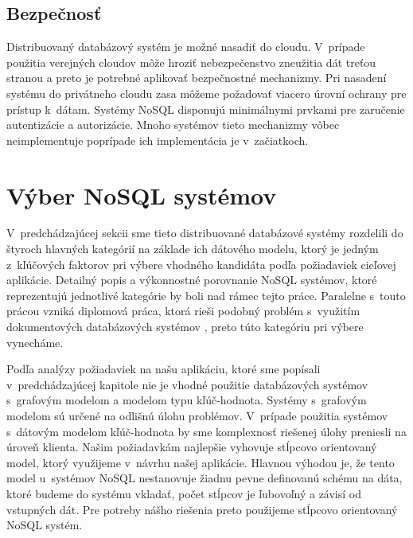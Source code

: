 \documentclass[11pt,twoside,a4paper]{book}
\begin{document}
\subsection{Bezpečnosť}
Distribuovaný databázový systém je možné nasadiť do cloudu. V~prípade použitia verejných cloudov môže hroziť nebezpečenstvo zneužitia dát treťou stranou a preto je potrebné aplikovať bezpečnostné mechanizmy. Pri nasadení systému do privátneho cloudu zasa môžeme požadovať viacero úrovní ochrany pre prístup k~dátam. Systémy NoSQL disponujú minimálnymi prvkami pre zaručenie autentizácie a autorizácie. Mnoho systémov tieto mechanizmy vôbec neimplementuje poprípade ich implementácia je v~začiatkoch.



\section{Výber NoSQL systémov}
V~predchádzajúcej sekcii sme tieto distribuované databázové systémy rozdelili do štyroch hlavných kategórií na základe ich dátového modelu, ktorý je jedným z~kľúčových faktorov pri výbere vhodného kandidáta podľa požiadaviek cieľovej aplikácie. Detailný popis a výkonnostné porovnanie NoSQL systémov, ktoré reprezentujú jednotlivé kategórie by boli nad rámec tejto práce. Paralelne s~touto prácou vzniká diplomová práca, ktorá rieši podobný problém s~využitím dokumentových databázových systémov  \cite{barina}, preto túto kategóriu pri výbere vynecháme.

Podľa analýzy požiadaviek na našu aplikáciu, ktoré sme popísali v~predchádzajúcej kapitole nie je vhodné použitie databázových systémov s~grafovým modelom a modelom typu kľúč-hodnota. Systémy s~grafovým modelom sú určené na odlišnú úlohu problémov. V~prípade použitia systémov s~dátovým modelom kľúč-hodnota by sme komplexnosť riešenej úlohy preniesli na úroveň klienta. Našim požiadavkám najlepšie vyhovuje stĺpcovo orientovaný model, ktorý využijeme v~návrhu našej aplikácie. Hlavnou výhodou je, že tento model u~systémov NoSQL nestanovuje žiadnu pevne definovanú schému na dáta, ktoré budeme do systému vkladať, počet stĺpcov je ľubovoľný a závisí od vstupných dát. Pre potreby nášho riešenia preto použijeme stĺpcovo orientovaný NoSQL systém.
\end{document}
